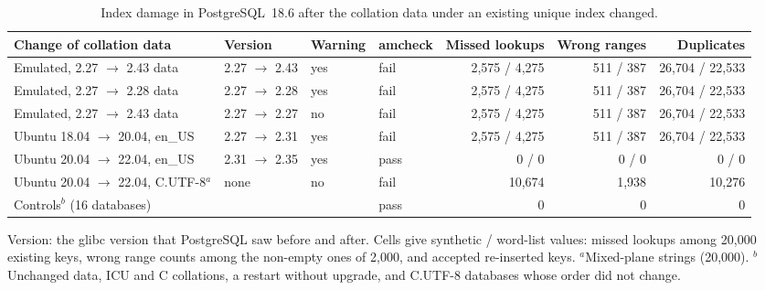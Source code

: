 \begin{table}[t]
\centering\footnotesize
\setlength{\tabcolsep}{3pt}
\caption{Index damage in PostgreSQL~18.6 after the collation data under an existing unique index changed.}
\label{tab:drift}
\begin{tabular}{@{}llllrrr@{}}
\toprule
Change of collation data & Version & Warning & amcheck & Missed lookups & Wrong ranges & Duplicates \\
\midrule
Emulated, 2.27 $\to$ 2.43 data & 2.27 $\to$ 2.43 & yes & fail & 2,575 / 4,275 & 511 / 387 & 26,704 / 22,533 \\
Emulated, 2.27 $\to$ 2.28 data & 2.27 $\to$ 2.28 & yes & fail & 2,575 / 4,275 & 511 / 387 & 26,704 / 22,533 \\
Emulated, 2.27 $\to$ 2.43 data & 2.27 $\to$ 2.27 & no & fail & 2,575 / 4,275 & 511 / 387 & 26,704 / 22,533 \\
Ubuntu 18.04 $\to$ 20.04, en\_US & 2.27 $\to$ 2.31 & yes & fail & 2,575 / 4,275 & 511 / 387 & 26,704 / 22,533 \\
Ubuntu 20.04 $\to$ 22.04, en\_US & 2.31 $\to$ 2.35 & yes & pass & 0 / 0 & 0 / 0 & 0 / 0 \\
Ubuntu 20.04 $\to$ 22.04, C.UTF-8$^{a}$ & none & no & fail & 10,674 & 1,938 & 10,276 \\
Controls$^{b}$ (16 databases) & & & pass & 0 & 0 & 0 \\
\bottomrule
\end{tabular}

\smallskip\footnotesize
Version: the glibc version that PostgreSQL saw before and after. Cells give synthetic / word-list values: missed lookups among 20,000 existing keys, wrong range counts among the non-empty ones of 2,000, and accepted re-inserted keys. $^{a}$Mixed-plane strings (20,000). $^{b}$Unchanged data, ICU and C collations, a restart without upgrade, and C.UTF-8 databases whose order did not change.
\end{table}
